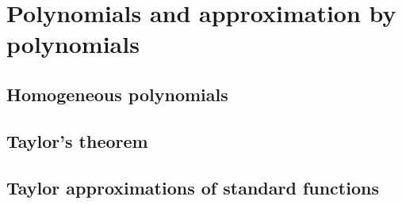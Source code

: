 \section{Polynomials and approximation by polynomials}

\subsection{Homogeneous polynomials}

\subsection{Taylor's theorem}

\subsection{Taylor approximations of standard functions}
